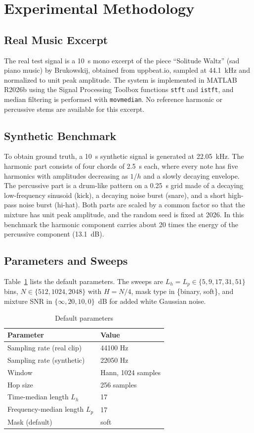 \documentclass[conference]{IEEEtran}
\begin{document}
\section{Experimental Methodology}
\subsection{Real Music Excerpt}
The real test signal is a 10~s mono excerpt of the piece ``Solitude Waltz'' (sad piano music) by Brukowskij, obtained from uppbeat.io, sampled at 44.1~kHz and normalized to unit peak amplitude. The system is implemented in MATLAB R2026b using the Signal Processing Toolbox functions \texttt{stft} and \texttt{istft}, and median filtering is performed with \texttt{movmedian}. No reference harmonic or percussive stems are available for this excerpt.

\subsection{Synthetic Benchmark}
To obtain ground truth, a 10~s synthetic signal is generated at 22.05~kHz. The harmonic part consists of four chords of 2.5~s each, where every note has five harmonics with amplitudes decreasing as $1/h$ and a slowly decaying envelope. The percussive part is a drum-like pattern on a 0.25~s grid made of a decaying low-frequency sinusoid (kick), a decaying noise burst (snare), and a short high-pass noise burst (hi-hat). Both parts are scaled by a common factor so that the mixture has unit peak amplitude, and the random seed is fixed at 2026. In this benchmark the harmonic component carries about 20 times the energy of the percussive component (13.1~dB).

\subsection{Parameters and Sweeps}
Table~\ref{tab:params} lists the default parameters. The sweeps are $L_h=L_p\in\{5,9,17,31,51\}$ bins, $N\in\{512,1024,2048\}$ with $H=N/4$, mask type in \{binary, soft\}, and mixture SNR in $\{\infty,20,10,0\}$~dB for added white Gaussian noise.

\begin{table}[t]
\centering
\caption{Default parameters}
\label{tab:params}
\begin{tabular}{ll}
\toprule
Parameter & Value\\
\midrule
Sampling rate (real clip) & 44100 Hz\\
Sampling rate (synthetic) & 22050 Hz\\
Window & Hann, 1024 samples\\
Hop size & 256 samples\\
Time-median length $L_h$ & 17\\
Frequency-median length $L_p$ & 17\\
Mask (default) & soft\\
\bottomrule
\end{tabular}
\end{table}
\end{document}
